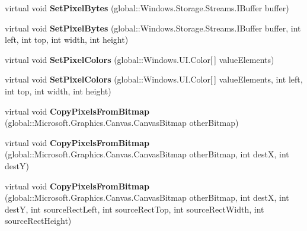 \begin{DoxyCompactItemize}
virtual void {\bfseries Set\+Pixel\+Bytes} (global\+::\+Windows.\+Storage.\+Streams.\+I\+Buffer buffer)
\item 
\mbox{\label{class_microsoft_1_1_graphics_1_1_canvas_1_1_canvas_bitmap_a9747aa3ff78e0ae0055791a869a151b2}} 
virtual void {\bfseries Set\+Pixel\+Bytes} (global\+::\+Windows.\+Storage.\+Streams.\+I\+Buffer buffer, int left, int top, int width, int height)
\item 
\mbox{\label{class_microsoft_1_1_graphics_1_1_canvas_1_1_canvas_bitmap_a3bcbd99d340c269c0506e66276c9416a}} 
virtual void {\bfseries Set\+Pixel\+Colors} (global\+::\+Windows.\+U\+I.\+Color\mbox{[}$\,$\mbox{]} value\+Elements)
\item 
\mbox{\label{class_microsoft_1_1_graphics_1_1_canvas_1_1_canvas_bitmap_ab9d4dff1bd09e063f59d9da1045a59ad}} 
virtual void {\bfseries Set\+Pixel\+Colors} (global\+::\+Windows.\+U\+I.\+Color\mbox{[}$\,$\mbox{]} value\+Elements, int left, int top, int width, int height)
\item 
\mbox{\label{class_microsoft_1_1_graphics_1_1_canvas_1_1_canvas_bitmap_a1480931696efcd8538d284276f2b09f2}} 
virtual void {\bfseries Copy\+Pixels\+From\+Bitmap} (global\+::\+Microsoft.\+Graphics.\+Canvas.\+Canvas\+Bitmap other\+Bitmap)
\item 
\mbox{\label{class_microsoft_1_1_graphics_1_1_canvas_1_1_canvas_bitmap_a12944c74a59e76bdc540ff16dc29cf7f}} 
virtual void {\bfseries Copy\+Pixels\+From\+Bitmap} (global\+::\+Microsoft.\+Graphics.\+Canvas.\+Canvas\+Bitmap other\+Bitmap, int destX, int destY)
\item 
\mbox{\label{class_microsoft_1_1_graphics_1_1_canvas_1_1_canvas_bitmap_a8a1449176fa88fe34007508f32796af2}} 
virtual void {\bfseries Copy\+Pixels\+From\+Bitmap} (global\+::\+Microsoft.\+Graphics.\+Canvas.\+Canvas\+Bitmap other\+Bitmap, int destX, int destY, int source\+Rect\+Left, int source\+Rect\+Top, int source\+Rect\+Width, int source\+Rect\+Height)

\end{DoxyCompactItemize}
